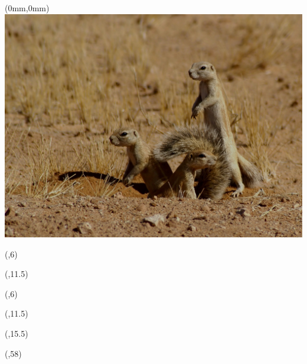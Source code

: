 \begin{textblock*}{\paperwidth}(0mm,0mm)
  \includegraphics[height=\imageheight,%
                   width=\paperwidth,%
                   trim=535 0 196 0,clip]{images/Xerus_inauris_1}
\end{textblock*}

\begin{textblock*}{\textwidth}(\TPHorizModule,6\TPVertModule)
  \textcolor{black!10}{\titlefmt}
\end{textblock*}

\begin{textblock*}{\textwidth}(\TPHorizModule,11.5\TPVertModule)
  \textcolor{black!10}{\authorfmt}
\end{textblock*}

\null\cleardoublepage


\begin{textblock*}{\textwidth}(\TPHorizModule,6\TPVertModule)
  \titlefmt
\end{textblock*}

\begin{textblock*}{\textwidth}(\TPHorizModule,11.5\TPVertModule)
  \authorfmt
\end{textblock*}

\begin{textblock*}{\textwidth}(\TPHorizModule,15.5\TPVertModule)
  \affiliation
\end{textblock*}

\begin{textblock*}{\textwidth}(\TPHorizModule,58\TPVertModule)
  \edition
\end{textblock*}
\endgroup

